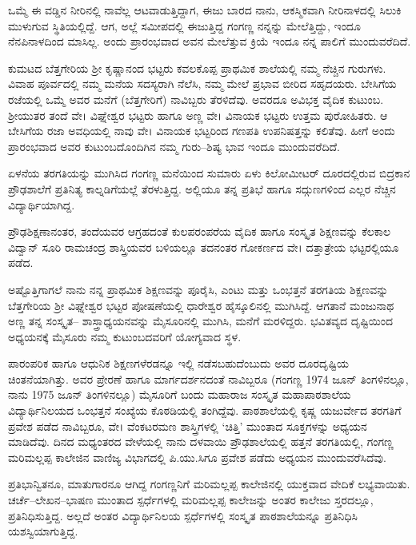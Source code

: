 ಒಮ್ಮೆ ಈ ವಡ್ಡಿನ ನೀರಿನಲ್ಲಿ ನಾವೆಲ್ಲ ಆಟವಾಡುತ್ತಿದ್ದಾಗ, ಈಜು ಬಾರದ ನಾನು, ಆಕಸ್ಮಿಕವಾಗಿ ನೀರಿನಾಳದಲ್ಲಿ ಸಿಲುಕಿ ಮುಳುಗುವ ಸ್ಥಿತಿಯಲ್ಲಿದ್ದೆ. ಆಗ, ಅಲ್ಲೆ ಸಮೀಪದಲ್ಲಿ ಈಜುತ್ತಿದ್ದ ಗಂಗಣ್ಣ ನನ್ನನ್ನು ಮೇಲೆತ್ತಿದ್ದು, ಇಂದೂ ನೆನಪಿನಾಳದಿಂದ ಮಾಸಿಲ್ಲ. ಅಂದು ಪ್ರಾರಂಭವಾದ ಅವನ ಮೇಲೆತ್ತುವ ಕ್ರಿಯೆ ಇಂದೂ ನನ್ನ ಪಾಲಿಗೆ ಮುಂದುವರೆದಿದೆ.

ಕುಮಟದ ಬೆತ್ತಗೇರಿಯ ಶ್ರೀ ಕೃಷ್ಣಾನಂದ ಭಟ್ಟರು ಕವಲಕೊಪ್ಪ ಪ್ರಾಥಮಿಕ ಶಾಲೆಯಲ್ಲಿ ನಮ್ಮ ನೆಚ್ಚಿನ ಗುರುಗಳು. ವಿವಾಹ ಪೂರ್ವದಲ್ಲಿ ನಮ್ಮ ಮನೆಯ ಸದಸ್ಯರಾಗಿ ನೆಲೆಸಿ, ನಮ್ಮ ಮೇಲೆ ಪ್ರಭಾವ ಬೀರಿದ ಸಹೃದಯರು. ಬೇಸಿಗೆಯ ರಜೆಯಲ್ಲಿ ಒಮ್ಮೆ ಅವರ ಮನೆಗೆ (ಬೆತ್ತಗೇರಿಗೆ) ನಾವಿಬ್ಬರು ತೆರಳಿದೆವು. ಅವರದೂ ಅವಿಭಕ್ತ ವೈದಿಕ ಕುಟುಂಬ. ಶ್ರೀಯುತರ ತಂದೆ ವೇ। ವಿಘ್ನೇಶ್ವರ ಭಟ್ಟರು ಹಾಗೂ ಅಣ್ಣ ವೇ। ವಿನಾಯಕ ಭಟ್ಟರು ಉತ್ತಮ ಪುರೋಹಿತರು. ಆ ಬೇಸಿಗೆಯ ರಜಾ ಅವಧಿಯಲ್ಲಿ ನಾವು ವೇ। ವಿನಾಯಕ ಭಟ್ಟರಿಂದ ಗಣಪತಿ ಉಪನಿಷತ್ತನ್ನು ಕಲಿತೆವು. ಹೀಗೆ ಅಂದು ಪ್ರಾರಂಭವಾದ ಅವರ ಕುಟುಂಬದೊಂದಿಗಿನ ನಮ್ಮ ಗುರು–ಶಿಷ್ಯ ಭಾವ ಇಂದೂ ಮುಂದುವರೆದಿದೆ. 

ಏಳನೆಯ ತರಗತಿಯನ್ನು ಮುಗಿಸಿದ ಗಂಗಣ್ಣ ಮನೆಯಿಂದ ಸುಮಾರು ಏಳು ಕಿಲೋಮೀಟರ್ ದೂರದಲ್ಲಿರುವ ಬಿದ್ರಕಾನ ಪ್ರೌಢಶಾಲೆಗೆ ಪ್ರತಿನಿತ್ಯ ಕಾಲ್ನಡಿಗೆಯಲ್ಲೆ ತೆರಳುತ್ತಿದ್ದ. ಅಲ್ಲಿಯೂ ತನ್ನ ಪ್ರತಿಭೆ ಹಾಗೂ ಸದ್ಗುಣಗಳಿಂದ ಎಲ್ಲರ ನೆಚ್ಚಿನ ವಿದ್ಯಾರ್ಥಿಯಾಗಿದ್ದ.

ಪ್ರೌಢಶಿಕ್ಷಣಾನಂತರ, ತಂದೆಯವರ ಆಗ್ರಹದಂತೆ ಕುಲಪರಂಪರೆಯ ವೈದಿಕ ಹಾಗೂ ಸಂಸ್ಕೃತ ಶಿಕ್ಷಣವನ್ನು ಕೆಲಕಾಲ ವಿದ್ವಾನ್ ಸೂರಿ ರಾಮಚಂದ್ರ ಶಾಸ್ತ್ರಿಯವರ ಬಳಿಯಲ್ಲೂ ತದನಂತರ ಗೋಕರ್ಣದ ವೇ। ದತ್ತಾತ್ರೇಯ ಭಟ್ಟರಲ್ಲಿಯೂ ಪಡೆದ.

ಅಷ್ಟೊತ್ತಿಗಾಗಲೆ ನಾನು ನನ್ನ ಪ್ರಾಥಮಿಕ ಶಿಕ್ಷಣವನ್ನು ಪೂರೈಸಿ, ಎಂಟು ಮತ್ತು ಒಂಭತ್ತನೆ ತರಗತಿಯ ಶಿಕ್ಷಣವನ್ನು ಬೆತ್ತಗೇರಿಯ ಶ್ರೀ ವಿಘ್ನೇಶ್ವರ ಭಟ್ಟರ ಪೋಷಣೆಯಲ್ಲಿ ಧಾರೇಶ್ವರ ಹೈಸ್ಕೂಲಿನಲ್ಲಿ ಮುಗಿಸಿದ್ದೆ. ಆಗತಾನೆ ಮಂಜುನಾಥ ಅಣ್ಣ ತನ್ನ ಸಂಸ್ಕೃತ– ಶಾಸ್ತ್ರಾಧ್ಯಯನವನ್ನು ಮೈಸೂರಿನಲ್ಲಿ ಮುಗಿಸಿ, ಮನೆಗೆ ಮರಳಿದ್ದರು. ಭವಿತವ್ಯದ ದೃಷ್ಟಿಯಿಂದ ಅಧ್ಯಯನಕ್ಕೆ ಮೈಸೂರು ನಮ್ಮ ಕುಟುಂಬದವರಿಗೆ ಯೋಗ್ಯವಾದ ಸ್ಥಳ.

ಪಾರಂಪರಿಕ ಹಾಗೂ ಆಧುನಿಕ ಶಿಕ್ಷಣಗಳೆರಡನ್ನೂ ಇಲ್ಲಿ ನಡೆಸಬಹುದೆಂಬುದು ಅವರ ದೂರದೃಷ್ಟಿಯ ಚಿಂತನೆಯಾಗಿತ್ತು. ಅವರ ಪ್ರೇರಣೆ ಹಾಗೂ ಮಾರ್ಗದರ್ಶನದಂತೆ ನಾವಿಬ್ಬರೂ (ಗಂಗಣ್ಣ 1974 ಜೂನ್ ತಿಂಗಳಿನಲ್ಲೂ, ನಾನು 1975 ಜೂನ್ ತಿಂಗಳಿನಲ್ಲೂ) ಮೈಸೂರಿಗೆ ಬಂದು ಮಹಾರಾಜ ಸಂಸ್ಕೃತ ಮಹಾಪಾಠಶಾಲೆಯ ವಿದ್ಯಾರ್ಥಿನಿಲಯದ ಒಂಭತ್ತನೆ ಸಂಖ್ಯೆಯ ಕೊಠಡಿಯಲ್ಲಿ ತಂಗಿದ್ದೆವು. ಪಾಠಶಾಲೆಯಲ್ಲಿ ಕೃಷ್ಣ ಯಜುರ್ವೇದ ತರಗತಿಗೆ ಪ್ರವೇಶ ಪಡೆದ ನಾವಿಬ್ಬರೂ, ವೇ। ವೆಂಕಟರಮಣ ಶಾಸ್ತ್ರಿಗಳಲ್ಲಿ ‘ಚಿತ್ತಿ’ ಮುಂತಾದ ಸೂಕ್ತಗಳನ್ನು ಅಧ್ಯಯನ ಮಾಡಿದೆವು. ದಿನದ ಮಧ್ಯಂತರದ ವೇಳೆಯಲ್ಲಿ ನಾನು ದಳವಾಯಿ ಪ್ರೌಢಶಾಲೆಯಲ್ಲಿ ಹತ್ತನೆ ತರಗತಿಯಲ್ಲಿ, ಗಂಗಣ್ಣ ಮರಿಮಲ್ಲಪ್ಪ ಕಾಲೇಜಿನ ವಾಣಿಜ್ಯ ವಿಭಾಗದಲ್ಲಿ ಪಿ.ಯು.ಸಿಗೂ ಪ್ರವೇಶ ಪಡೆದು ಅಧ್ಯಯನ ಮುಂದುವರೆಸಿದೆವು.

ಪ್ರತಿಭಾನ್ವಿತನೂ, ಮಾತುಗಾರನೂ ಆಗಿದ್ದ ಗಂಗಣ್ಣನಿಗೆ ಮರಿಮಲ್ಲಪ್ಪ ಕಾಲೇಜಿನಲ್ಲಿ ಯುಕ್ತವಾದ ವೇದಿಕೆ ಲಭ್ಯವಾಯಿತು. ಚರ್ಚೆ–ಲೇಖನ–ಭಾಷಣ ಮುಂತಾದ ಸ್ಪರ್ಧೆಗಳಲ್ಲಿ ಮರಿಮಲ್ಲಪ್ಪ ಕಾಲೇಜನ್ನು ಅಂತರ ಕಾಲೇಜು ಸ್ತರದಲ್ಲೂ, ಪ್ರತಿನಿಧಿಸುತ್ತಿದ್ದ. ಅಲ್ಲದೆ ಅಂತರ ವಿದ್ಯಾರ್ಥಿನಿಲಯ ಸ್ಪರ್ಧೆಗಳಲ್ಲಿ ಸಂಸ್ಕೃತ ಪಾಠಶಾಲೆಯನ್ನೂ ಪ್ರತಿನಿಧಿಸಿ ಯಶಸ್ವಿಯಾಗುತ್ತಿದ್ದ. 

